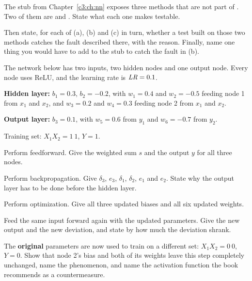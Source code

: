  The stub from Chapter~\ref{c3:ch:nn} exposes three methods that are not part of
. Two of them are  and .
State what each one makes testable.

Then state, for each of (a), (b) and (c) in turn, whether a test built on those two methods catches
the fault described there, with the reason. Finally, name one thing you would have to add to the
stub to catch the fault in (b). 

\label{exa:q:3}

The network below has two inputs, two hidden nodes and one output node. Every node uses ReLU, and
the learning rate is $\mathit{LR} = 0.1$.

\textbf{Hidden layer:} $b_1 = 0.3$, $b_2 = -0.2$, with $w_1 = 0.4$ and $w_2 = -0.5$ feeding node 1
from $x_1$ and $x_2$, and $w_3 = 0.2$ and $w_4 = 0.3$ feeding node 2 from $x_1$ and $x_2$.

\textbf{Output layer:} $b_3 = 0.1$, with $w_5 = 0.6$ from $y_1$ and $w_6 = -0.7$ from $y_2$.

Training set: $X_1X_2 = 1\ 1$, $Y = 1$.

 Perform feedforward. Give the weighted sum $s$ and the output $y$ for all three nodes.

 Perform backpropagation. Give $\delta_3$, $e_3$, $\delta_1$, $\delta_2$, $e_1$ and $e_2$.
State why the output layer has to be done before the hidden layer. 

 Perform optimization. Give all three updated biases and all six updated weights.

 Feed the same input forward again with the updated parameters. Give the new output and the
new deviation, and state by how much the deviation shrank. 

 The \textbf{original} parameters are now used to train on a different set:
$X_1X_2 = 0\ 0$, $Y = 0$. Show that node 2's bias and both of its weights leave this step completely
unchanged, name the phenomenon, and name the activation function the book recommends as a
countermeasure. 

\label{exa:q:4}

